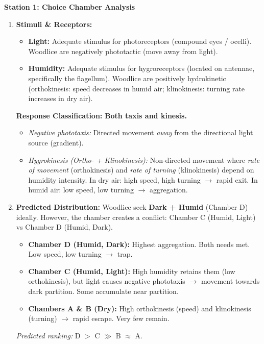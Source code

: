 \documentclass[11pt]{article}
\newcounter{popsec}
\newcounter{popsub}
\newcommand{\courssub}[1]{%
  \stepcounter{popsub}%
  \par\vspace{9pt}\noindent{\popxbold\fontsize{11.5}{13}\selectfont\color{popink}{\color{poporange}\thepopsec.\thepopsub}\hspace{6pt}#1}\par\nopagebreak\vspace{4pt}
}
\begin{document}
\courssub{Model Answers}

\textbf{Station 1: Choice Chamber Analysis}

\begin{enumerate}
    \item \textbf{Stimuli \& Receptors:}
    \begin{itemize}
        \item \textbf{Light:} Adequate stimulus for photoreceptors (compound eyes / ocelli). Woodlice are negatively phototactic (move away from light).
        \item \textbf{Humidity:} Adequate stimulus for hygroreceptors (located on antennae, specifically the flagellum). Woodlice are positively hydrokinetic (orthokinesis: speed decreases in humid air; klinokinesis: turning rate increases in dry air).
    \end{itemize}
    \textbf{Response Classification:} \textbf{Both taxis and kinesis.}
    \begin{itemize}
        \item \emph{Negative phototaxis:} Directed movement \emph{away} from the directional light source (gradient).
        \item \emph{Hygrokinesis (Ortho- + Klinokinesis):} Non-directed movement where \emph{rate of movement} (orthokinesis) and \emph{rate of turning} (klinokinesis) depend on humidity intensity. In dry air: high speed, high turning $\rightarrow$ rapid exit. In humid air: low speed, low turning $\rightarrow$ aggregation.
    \end{itemize}

    \item \textbf{Predicted Distribution:}
    Woodlice seek \textbf{Dark + Humid} (Chamber D) ideally. However, the chamber creates a conflict: Chamber C (Humid, Light) vs Chamber D (Humid, Dark).
    \begin{itemize}
        \item \textbf{Chamber D (Humid, Dark):} Highest aggregation. Both needs met. Low speed, low turning $\rightarrow$ trap.
        \item \textbf{Chamber C (Humid, Light):} High humidity retains them (low orthokinesis), but light causes negative phototaxis $\rightarrow$ movement towards dark partition. Some accumulate near partition.
        \item \textbf{Chambers A \& B (Dry):} High orthokinesis (speed) and klinokinesis (turning) $\rightarrow$ rapid escape. Very few remain.
    \end{itemize}
    \emph{Predicted ranking:} D $>$ C $\gg$ B $\approx$ A.


\end{enumerate}
\end{document}
